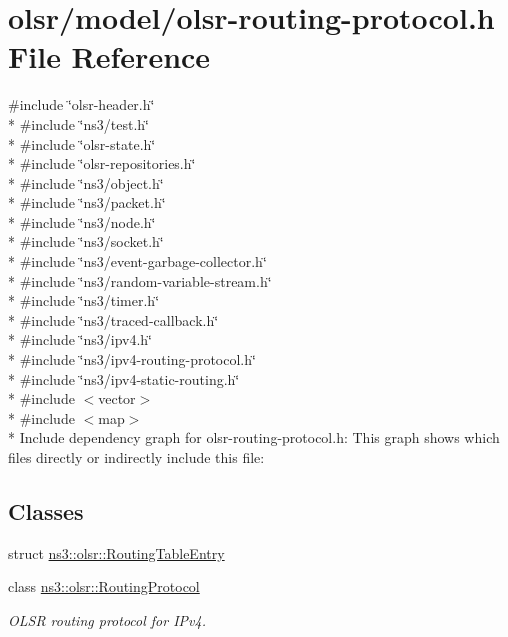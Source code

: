 \hypertarget{olsr-routing-protocol_8h}{}\section{olsr/model/olsr-\/routing-\/protocol.h File Reference}
\label{olsr-routing-protocol_8h}
{\ttfamily \#include \char`\"{}olsr-\/header.\+h\char`\"{}}\\*
{\ttfamily \#include \char`\"{}ns3/test.\+h\char`\"{}}\\*
{\ttfamily \#include \char`\"{}olsr-\/state.\+h\char`\"{}}\\*
{\ttfamily \#include \char`\"{}olsr-\/repositories.\+h\char`\"{}}\\*
{\ttfamily \#include \char`\"{}ns3/object.\+h\char`\"{}}\\*
{\ttfamily \#include \char`\"{}ns3/packet.\+h\char`\"{}}\\*
{\ttfamily \#include \char`\"{}ns3/node.\+h\char`\"{}}\\*
{\ttfamily \#include \char`\"{}ns3/socket.\+h\char`\"{}}\\*
{\ttfamily \#include \char`\"{}ns3/event-\/garbage-\/collector.\+h\char`\"{}}\\*
{\ttfamily \#include \char`\"{}ns3/random-\/variable-\/stream.\+h\char`\"{}}\\*
{\ttfamily \#include \char`\"{}ns3/timer.\+h\char`\"{}}\\*
{\ttfamily \#include \char`\"{}ns3/traced-\/callback.\+h\char`\"{}}\\*
{\ttfamily \#include \char`\"{}ns3/ipv4.\+h\char`\"{}}\\*
{\ttfamily \#include \char`\"{}ns3/ipv4-\/routing-\/protocol.\+h\char`\"{}}\\*
{\ttfamily \#include \char`\"{}ns3/ipv4-\/static-\/routing.\+h\char`\"{}}\\*
{\ttfamily \#include $<$vector$>$}\\*
{\ttfamily \#include $<$map$>$}\\*
Include dependency graph for olsr-\/routing-\/protocol.h\+:
This graph shows which files directly or indirectly include this file\+:
\subsection*{Classes}
\begin{DoxyCompactItemize}
\item 
struct \hyperlink{structns3_1_1olsr_1_1RoutingTableEntry}{ns3\+::olsr\+::\+Routing\+Table\+Entry}
\item 
class \hyperlink{classns3_1_1olsr_1_1RoutingProtocol}{ns3\+::olsr\+::\+Routing\+Protocol}
\begin{DoxyCompactList}\small\item\em O\+L\+SR routing protocol for I\+Pv4. \end{DoxyCompactList}\end{DoxyCompactItemize}
